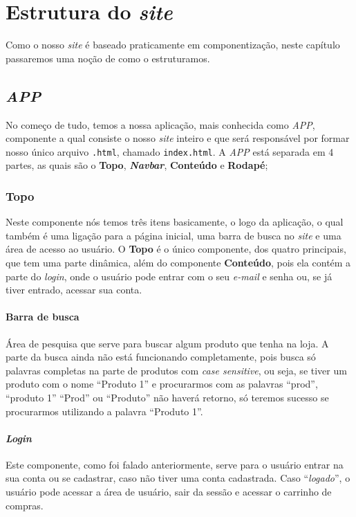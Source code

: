 \chapter{Estrutura do \emph{site}}
Como o nosso \emph{site} é baseado praticamente em componentização, neste
capítulo passaremos uma noção de como o estruturamos.

\section{\emph{APP}}
No começo de tudo, temos a nossa aplicação, mais conhecida como \emph{APP},
componente a qual consiste o nosso \emph{site} inteiro e que será responsável
por formar nosso único arquivo \texttt{.html}, chamado \texttt{index.html}. A
\emph{APP} está separada em 4 partes, as quais são o \textbf{Topo},
\emph{\textbf{Navbar}}, \textbf{Conteúdo} e \textbf{Rodapé};

\subsection{Topo}
Neste componente nós temos três itens basicamente, o logo da aplicação, o qual
também é uma ligação para a página inicial, uma barra de busca no \emph{site} e
uma área de acesso ao usuário. O \textbf{Topo} é o único componente, dos quatro
principais, que tem uma parte dinâmica, além do componente \textbf{Conteúdo},
pois ela contém a parte do \emph{login}, onde o usuário pode entrar com o seu
\emph{e-mail} e senha ou, se já tiver entrado, acessar sua conta.

\subsubsection{Barra de busca}
Área de pesquisa que serve para buscar algum produto que tenha na loja. A parte
da busca ainda não está funcionando completamente, pois busca só palavras
completas na parte de produtos com \emph{case sensitive}, ou seja, se tiver um
produto com o nome “Produto 1” e procurarmos com as palavras “prod”, “produto 1”
“Prod” ou “Produto” não haverá retorno, só teremos sucesso se procurarmos
utilizando a palavra “Produto 1”.

\subsubsection{\emph{Login}}
Este componente, como foi falado anteriormente, serve para o usuário entrar na
sua conta ou se cadastrar, caso não tiver uma conta cadastrada. Caso
“\emph{logado}”, o usuário pode acessar a área de usuário, sair da sessão e
acessar o carrinho de compras.

